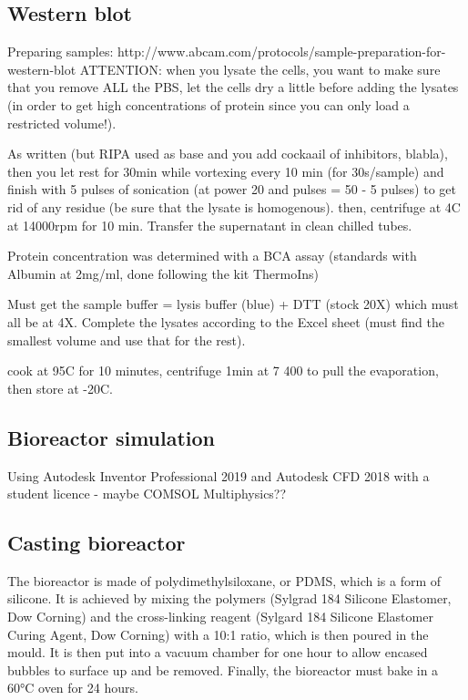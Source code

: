 \documentclass[onecolumn,10pt]{asme2ej}
\begin{document}
\subsection{Western blot}
Preparing samples: http://www.abcam.com/protocols/sample-preparation-for-western-blot
ATTENTION: when you lysate the cells, you want to make sure that you remove ALL the PBS, let the cells dry a little before adding the lysates (in order to get high concentrations of protein since you can only load a restricted volume!).

As written (but RIPA used as base and you add cockaail of inhibitors, blabla), then you let rest for 30min while vortexing every 10 min (for 30s/sample) and finish with 5 pulses of sonication (at power 20 and pulses = 50 - 5 pulses) to get rid of any residue (be sure that the lysate is homogenous). then, centrifuge at 4C at 14000rpm for 10 min. Transfer the supernatant in clean chilled tubes. 

Protein concentration was determined with a BCA assay (standards with Albumin at 2mg/ml, done following the kit ThermoIns)


Must get the sample buffer = lysis buffer (blue) + DTT (stock 20X) which must all be at 4X. 
Complete the lysates according to the Excel sheet (must find the smallest volume and use that for the rest).

cook at 95C for 10 minutes, centrifuge 1min at 7 400 to pull the evaporation, then store at -20C. 

\subsection{Bioreactor simulation}
Using Autodesk Inventor Professional 2019 and Autodesk CFD 2018 with a student licence - maybe COMSOL Multiphysics??


\subsection{Casting bioreactor}
The bioreactor is made of polydimethylsiloxane, or PDMS, which is a form of silicone. It is achieved by mixing the polymers (Sylgrad 184 Silicone Elastomer, Dow Corning) and the cross-linking reagent (Sylgard 184 Silicone Elastomer Curing Agent, Dow Corning) with a 10:1 ratio, which is then poured in the mould. It is then put into a vacuum chamber for one hour to allow encased bubbles to surface up and be removed. Finally, the bioreactor must bake in a 60°C oven for 24 hours.  
\end{document}
